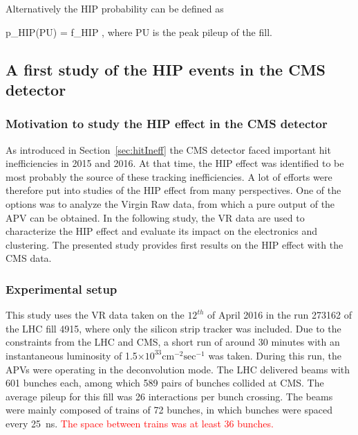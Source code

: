 Alternatively the HIP probability can be defined as

{
p_{HIP}(PU) = f_{HIP} ,
}
where PU is the peak pileup of the fill. 



\subsection{A first study of the HIP events in the CMS detector~\label{sec:firstStudy}}

\subsubsection{Motivation to study the HIP effect in the CMS detector}

As introduced in Section~\ref{sec:hitIneff} the CMS detector faced important hit inefficiencies in 2015 and 2016. At that time, the HIP effect was identified to be most probably the source of these tracking inefficiencies. A lot of efforts were therefore put into studies of the HIP effect from many perspectives. One of the options was to analyze the Virgin Raw data, from which a pure output of the APV can be obtained. In the following study, the VR data are used to characterize the HIP effect and evaluate its impact on the electronics and clustering. The presented study provides first results on the HIP effect with the CMS data.

\subsubsection{Experimental setup} 

This study uses the VR data taken on the $12^{th}$ of April 2016 in the run 273162 of the LHC fill 4915, where only the silicon strip tracker was included. Due to the constraints from the LHC and CMS, a short run of around 30 minutes with an instantaneous luminosity of 1.5$\times 10^{33} \mathrm{cm^{-2} sec^{-1}}$ was taken. During this run, the APVs were operating in the deconvolution mode. The LHC delivered beams with 601 bunches each, among which 589 pairs of bunches collided at CMS. The average pileup for this fill was 26 interactions per bunch crossing. The beams were mainly composed of trains of 72 bunches, in which bunches were spaced every 25~ns. \textcolor{red}{The space between trains was at least 36 bunches.}

